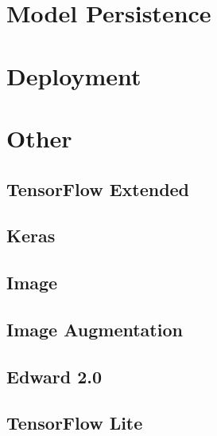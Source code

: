 




\section{Model Persistence}






\section{Deployment}




\section{Other}



\subsection{TensorFlow Extended}

\subsection{Keras}

\subsection{Image}

\subsection{Image Augmentation}

\subsection{Edward 2.0}

\subsection{TensorFlow Lite}
